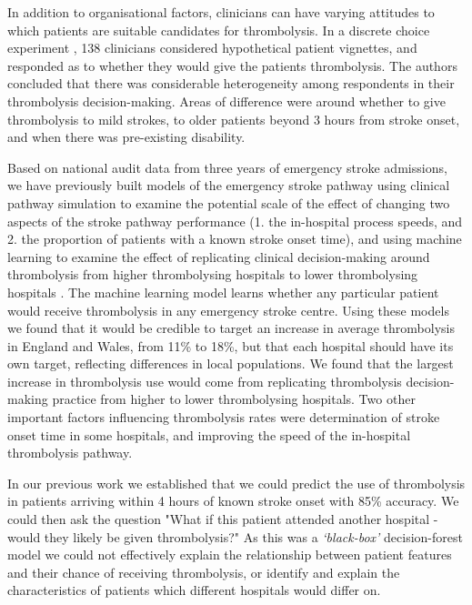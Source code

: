 In addition to organisational factors, clinicians can have varying attitudes to which patients are suitable candidates for thrombolysis. In a discrete choice experiment \cite{de_brun_factors_2018}, 138 clinicians considered hypothetical patient vignettes, and responded as to whether they would give the patients thrombolysis. The authors concluded that there was considerable heterogeneity among respondents in their thrombolysis decision-making. Areas of difference were around whether to give thrombolysis to mild strokes, to older patients beyond 3 hours from stroke onset, and when there was pre-existing disability.

Based on national audit data from three years of emergency stroke admissions, we have previously built models of the emergency stroke pathway using clinical pathway simulation to examine the potential scale of the effect of changing two aspects of the stroke pathway performance (1. the in-hospital process speeds, and 2. the proportion of patients with a known stroke onset time), and using machine learning to examine the effect of replicating clinical decision-making around thrombolysis from higher thrombolysing hospitals to lower thrombolysing hospitals \cite{allen_using_2022, allen_use_2022}. The machine learning model learns whether any particular patient would receive thrombolysis in any emergency stroke centre. Using these models we found that it would be credible to target an increase in average thrombolysis in England and Wales, from 11\% to 18\%, but that each hospital should have its own target, reflecting differences in local populations. We found that the largest increase in thrombolysis use would come from replicating thrombolysis decision-making practice from higher to lower thrombolysing hospitals. Two other important factors influencing thrombolysis rates were determination of stroke onset time in some hospitals, and improving the speed of the in-hospital thrombolysis pathway.


In our previous work we established that we could predict the use of thrombolysis in patients arriving within 4 hours of known stroke onset with 85\% accuracy. We could then ask the question "What if this patient attended another hospital - would they likely be given thrombolysis?" As this was a \emph{`black-box'} decision-forest model we could not effectively explain the relationship between patient features and their chance of receiving thrombolysis, or identify and explain the characteristics of patients which different hospitals would differ on.

